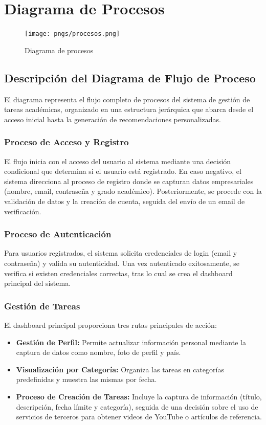 \documentclass{pretexto/report}
\begin{document}
\section{Diagrama de Procesos}
\begin{figure}[H]
    \centering
    \texttt{[image: pngs/procesos.png]}
    \caption{Diagrama de procesos}
\end{figure}

\subsection{Descripción del Diagrama de Flujo de Proceso}
El diagrama representa el flujo completo de procesos del sistema de gestión de tareas académicas, 
organizado en una estructura jerárquica que abarca desde el acceso inicial hasta la generación de 
recomendaciones personalizadas.

\subsubsection{Proceso de Acceso y Registro}
El flujo inicia con el acceso del usuario al sistema mediante una decisión condicional que determina 
si el usuario está registrado. En caso negativo, el sistema direcciona al proceso de registro donde 
se capturan datos empresariales (nombre, email, contraseña y grado académico). Posteriormente, 
se procede con la validación de datos y la creación de cuenta, seguida del envío de un email de 
verificación.
\subsubsection{Proceso de Autenticación}
Para usuarios registrados, el sistema solicita credenciales de login (email y contraseña) y valida 
su autenticidad. Una vez autenticado exitosamente, se verifica si existen credenciales correctas, 
tras lo cual se crea el dashboard principal del sistema.

\subsubsection{Gestión de Tareas}
El dashboard principal proporciona tres rutas principales de acción:
\begin{itemize}
\item \textbf{Gestión de Perfil:} Permite actualizar información personal mediante la captura de datos como nombre,
 foto de perfil y país.
\item \textbf{Visualización por Categoría:} Organiza las tareas en categorías predefinidas y muestra las mismas 
por fecha.
\item \textbf{Proceso de Creación de Tareas:} Incluye la captura de información (título, descripción, fecha límite
 y categoría), seguida de una decisión sobre el uso de servicios de terceros para obtener videos de YouTube o
  artículos de referencia.
\end{itemize}
\end{document}
